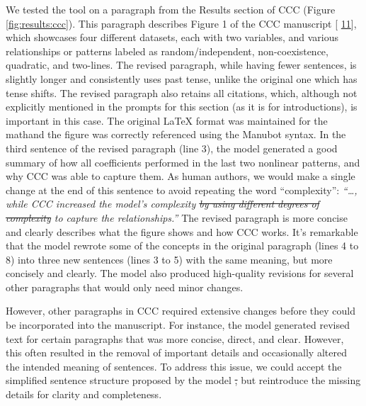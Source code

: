 \documentclass[
]{article}
\providecommand{\DIFaddtex}[1]{{\protect\color{blue}\uwave{#1}}} %
\providecommand{\DIFdeltex}[1]{{\protect\color{red}\sout{#1}}}                      %
\providecommand{\DIFaddbegin}{} %
\providecommand{\DIFaddend}{} %
\providecommand{\DIFdelbegin}{} %
\providecommand{\DIFdelend}{} %
\providecommand{\DIFadd}[1]{\texorpdfstring{\DIFaddtex{#1}}{#1}} %
\providecommand{\DIFdel}[1]{\texorpdfstring{\DIFdeltex{#1}}{}} %
\newcommand{\DIFscaledelfig}{0.5}
\newlength{\DIFdelgraphicswidth} %
\newlength{\DIFdelgraphicsheight} %
\newcommand{\DIFaddincludegraphics}[2][]{{\color{blue}\fbox{\DIFOincludegraphics[#1]{#2}}}} %
\newcommand{\DIFdelincludegraphics}[2][]{%
\sbox{\DIFdelgraphicsbox}{\DIFOincludegraphics[#1]{#2}}%
\settoboxwidth{\DIFdelgraphicswidth}{\DIFdelgraphicsbox} %
\settoboxtotalheight{\DIFdelgraphicsheight}{\DIFdelgraphicsbox} %
\scalebox{\DIFscaledelfig}{%
\parbox[b]{\DIFdelgraphicswidth}{\usebox{\DIFdelgraphicsbox}\\[-\baselineskip] \rule{\DIFdelgraphicswidth}{0em}}\llap{\resizebox{\DIFdelgraphicswidth}{\DIFdelgraphicsheight}{%
\setlength{\unitlength}{\DIFdelgraphicswidth}%
\begin{picture}(1,1)%
\thicklines\linethickness{2pt} %
{\color[rgb]{1,0,0}\put(0,0){\framebox(1,1){}}}%
{\color[rgb]{1,0,0}\put(0,0){\line( 1,1){1}}}%
{\color[rgb]{1,0,0}\put(0,1){\line(1,-1){1}}}%
\end{picture}%
}\hspace*{3pt}}} %
} %
\DeclareRobustCommand{\DIFaddbegin}{\DIFOaddbegin \let\includegraphics\DIFaddincludegraphics} %
\DeclareRobustCommand{\DIFaddend}{\DIFOaddend \let\includegraphics\DIFOincludegraphics} %
\DeclareRobustCommand{\DIFdelbegin}{\DIFOdelbegin \let\includegraphics\DIFdelincludegraphics} %
\DeclareRobustCommand{\DIFdelend}{\DIFOaddend \let\includegraphics\DIFOincludegraphics} %
\begin{document}
We tested the tool on a paragraph from the Results section of CCC (Figure \ref{fig:results:ccc}).
This paragraph describes Figure 1 of the CCC manuscript {[}\protect\DIFdelbegin %
\DIFdelend \DIFaddbegin \hyperlink{ref-eirYTTyk}{11}{]}\DIFaddend , which showcases four different datasets, each with two variables, and various relationships or patterns labeled as random/independent, non-coexistence, quadratic, and two-lines.
The revised paragraph, while having fewer sentences, is slightly longer and consistently uses \DIFaddbegin \DIFadd{the }\DIFaddend past tense, unlike the original one which has tense shifts.
The revised paragraph also retains all citations, which, although not explicitly mentioned in the prompts for this section (as it is for introductions), is important in this case.
The original LaTeX format was maintained for the math\DIFaddbegin \DIFadd{, }\DIFaddend and the figure was correctly referenced using the Manubot syntax.
In the third sentence of the revised paragraph (line 3), the model generated a good summary of how all coefficients performed in the last two nonlinear patterns, and why CCC was able to capture them.
As human authors, we would make a single change at the end of this sentence to avoid repeating the word ``complexity'': \emph{``\ldots, while CCC increased the model's complexity \sout{by using different degrees of complexity} to capture the relationships.''}
The revised paragraph is more concise and clearly describes what the figure shows and how CCC works.
It's remarkable that the model rewrote some of the concepts in the original paragraph (lines 4 to 8) into three new sentences (lines 3 to 5) with the same meaning, but more concisely and clearly.
The model also produced high-quality revisions for several other paragraphs that would only need minor changes.

However, other paragraphs in CCC required extensive changes before they could be incorporated into the manuscript.
For instance, the model generated revised text for certain paragraphs that was more concise, direct, and clear.
However, this often resulted in the removal of important details and occasionally altered the intended meaning of sentences.
To address this issue, we could accept the simplified sentence structure proposed by the model \DIFdelbegin \DIFdel{, }\DIFdelend but reintroduce the missing details for clarity and completeness.

% 
\end{document}
